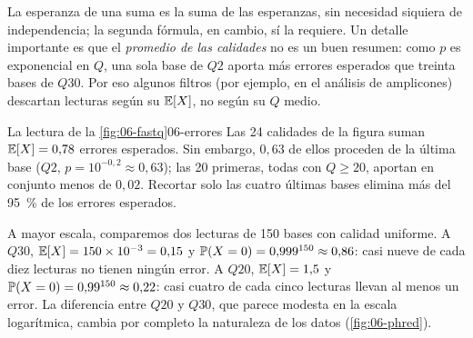 La esperanza de una suma es la suma de las esperanzas, sin necesidad siquiera de independencia; la segunda fórmula, en cambio, sí la requiere. Un detalle importante es que el \emph{promedio de las calidades} no es un buen resumen: como $p$ es exponencial en $Q$, una sola base de $Q2$ aporta más errores esperados que treinta bases de $Q30$. Por eso algunos filtros (por ejemplo, en el análisis de amplicones) descartan lecturas según su $\mathbb{E}[X]$, no según su $Q$ medio.

\begin{ejemplo}{La lectura de la \cref{fig:06-fastq}}{06-errores}
Las 24 calidades de la figura suman $\mathbb{E}[X] = 0{,}78$ errores esperados. Sin embargo, $0{,}63$ de ellos proceden de la última base ($Q2$, $p=10^{-0{,}2}\approx0{,}63$); las 20 primeras, todas con $Q\ge20$, aportan en conjunto menos de $0{,}02$. Recortar solo las cuatro últimas bases elimina más del \SI{95}{\percent} de los errores esperados.

A mayor escala, comparemos dos lecturas de 150 bases con calidad uniforme. A $Q30$, $\mathbb{E}[X]=150\times10^{-3}=0{,}15$ y $\mathbb{P}(X=0)=0{,}999^{150}\approx0{,}86$: casi nueve de cada diez lecturas no tienen ningún error. A $Q20$, $\mathbb{E}[X]=1{,}5$ y $\mathbb{P}(X=0)=0{,}99^{150}\approx0{,}22$: casi cuatro de cada cinco lecturas llevan al menos un error. La diferencia entre $Q20$ y $Q30$, que parece modesta en la escala logarítmica, cambia por completo la naturaleza de los datos (\cref{fig:06-phred}).
\end{ejemplo}


